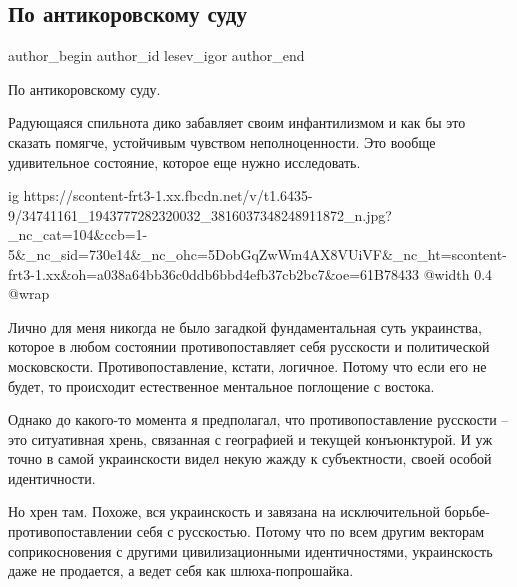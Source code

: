  
 
 
 
 
 
\subsection{По антикоровскому суду}
\label{sec:08_06_2018.fb.lesev_igor.2.antikor_sud}
 
\ifcmt
 author_begin
   author_id lesev_igor
 author_end
\fi

По антикоровскому суду.

Радующаяся спильнота дико забавляет своим инфантилизмом и как бы это сказать
помягче, устойчивым чувством неполноценности. Это вообще удивительное
состояние, которое еще нужно исследовать.

\ifcmt
  ig https://scontent-frt3-1.xx.fbcdn.net/v/t1.6435-9/34741161_1943777282320032_3816037348248911872_n.jpg?_nc_cat=104&ccb=1-5&_nc_sid=730e14&_nc_ohc=5DobGqZwWm4AX8VUiVF&_nc_ht=scontent-frt3-1.xx&oh=a038a64bb36c0ddb6bbd4efb37cb2bc7&oe=61B78433
  @width 0.4
  @wrap 
\fi

Лично для меня никогда не было загадкой фундаментальная суть украинства,
которое в любом состоянии противопоставляет себя русскости и политической
московскости. Противопоставление, кстати, логичное. Потому что если его не
будет, то происходит естественное ментальное поглощение с востока.

Однако до какого-то момента я предполагал, что противопоставление русскости –
это ситуативная хрень, связанная с географией и текущей конъюнктурой. И уж
точно в самой украинскости видел некую жажду к субъектности, своей особой
идентичности.

Но хрен там. Похоже, вся украинскость и завязана на исключительной
борьбе-противопоставлении себя с русскостью. Потому что по всем другим векторам
соприкосновения с другими цивилизационными идентичностями, украинскость даже не
продается, а ведет себя как шлюха-попрошайка.

